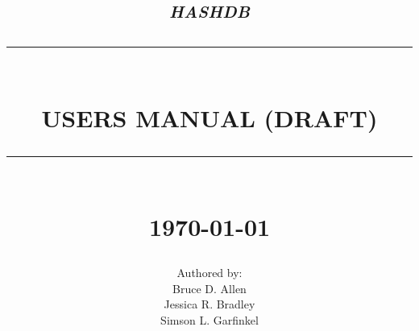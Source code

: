 \begin{titlepage}





%



\newcommand{\TRule}[1]{\rule{\linewidth}{#1}} 	%

\makeatletter							%
\def\printtitle{%
    {\centering \@title\par}}
\makeatother									

\makeatletter							%
\def\printauthor{%
    {\centering \large \@author}}				
\makeatother							

\title{	\LARGE \textsc{\textit{hashdb}} 	%
		 	\\[1.0cm]													%
			\TRule{0.5pt} \\										%
			\LARGE \textbf{\uppercase{Users Manual (DRAFT)}}	%
			\TRule{2pt} \\ [0.5cm]								%
			\normalsize \today									%
		}
\author{
		Authored by: \\
		Bruce D. Allen\\
		Jessica R. Bradley\\
		Simson L. Garfinkel\\		
}

\thispagestyle{empty}				%

\printtitle									%
  	\vfill
\printauthor								%














\end{titlepage}
